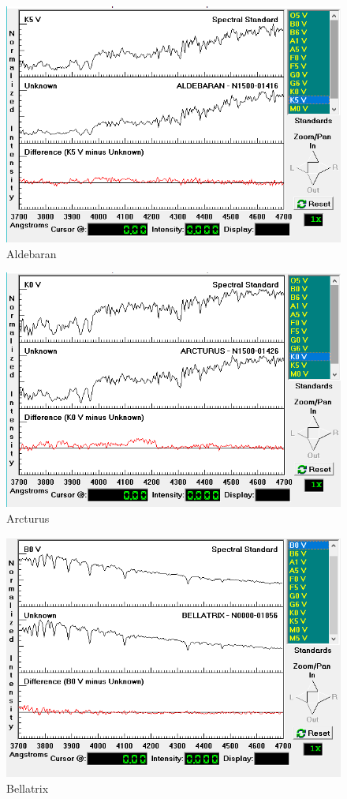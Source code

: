 \documentclass[letterpaper,11pt]{report}
\begin{document}
    \begin{figure}[H]
        \centering
        \includegraphics[scale=0.4]{Aldebaran.png}
        \caption{Aldebaran}
        \label{fig:my_label}
    \end{figure}
    \begin{figure}[H]
        \centering
        \includegraphics[scale=0.4]{Arcturus.png}
        \caption{Arcturus}
        \label{fig:my_label}
    \end{figure}
    \begin{figure}[H]
        \centering
        \includegraphics[scale=0.4]{Bellatrix.png}
        \caption{Bellatrix}
        \label{fig:my_label}
    \end{figure}
\end{document}
